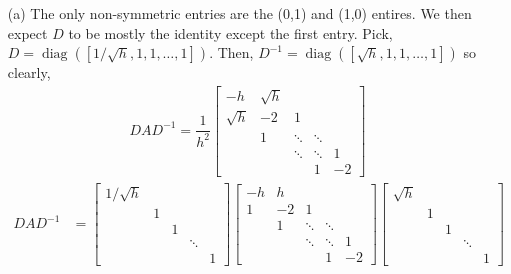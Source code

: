 \documentclass[10pt]{article}
\begin{document}
\begin{solution}[Solution]
\begin{enumerate}
    \item[(a)] The only non-symmetric entries are the (0,1) and (1,0) entires. We then expect \( D \) to be mostly the identity except the first entry. Pick, \( D = \operatorname{diag}([1/\sqrt{h}, 1, 1, \ldots, 1]) \). Then, \( D^{-1} = \operatorname{diag}([\sqrt{h},1,1,\ldots,1]) \) so clearly,
        \begin{align*}
            DAD^{-1} = 
            \dfrac{1}{h^2}
            \left[\begin{array}{rrrrr}
                -h & \sqrt{h}    \\
                \sqrt{h}  & -2 & 1 \\
                & 1 & \ddots & \ddots    \\
                && \ddots & \ddots & 1    \\
                &&& 1  & -2 
            \end{array}\right] 
        \end{align*}
\iffalse
        \begin{align*}
            DAD^{-1} &=  
            \left[\begin{array}{rrrrr}
                1/\sqrt{h} \\
                & 1 \\
                && 1 \\
                &&& \ddots \\
                &&&&1 
            \end{array}\right]
            \left[\begin{array}{rrrrr}
                -h & h    \\
                1  & -2 & 1 \\
                & 1 & \ddots & \ddots    \\
                && \ddots & \ddots & 1    \\
                &&& 1  & -2 
            \end{array}\right]
            \left[\begin{array}{rrrrr}
                \sqrt{h} \\
                & 1 \\
                && 1 \\
                &&& \ddots \\
                &&&&1 
            \end{array}\right]

\end{align*}
\end{enumerate}
\end{solution}
\end{document}

